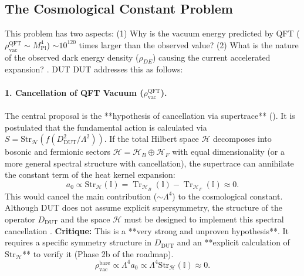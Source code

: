 \documentclass[11pt, a4paper]{article}
\theoremstyle{remark}
\newcommand{\Str}{\mathrm{Str}}
\DeclareMathOperator{\Tr}{Tr}
\newcommand{\Mpl}{M_{\mathrm{Pl}}}
\begin{document}
\subsection{The Cosmological Constant Problem }
\label{sec:problema_cc_final_revised}
This problem has two aspects: (1) Why is the vacuum energy predicted by QFT (\( \rho_{\text{vac}}^{\text{QFT}} \sim \Mpl^4 \)) \( \sim 10^{120} \) times larger than the observed value? (2) What is the nature of the observed dark energy density (\( \rho_{DE} \)) causing the current accelerated expansion? \citep{Weinberg1989CosmoConst}.
DUT DUT addresses this as follows:

\paragraph{1. Cancellation of QFT Vacuum (\( \rho_{\text{vac}}^{\text{QFT}} \)).}
The central proposal is the **hypothesis of cancellation via supertrace** (). It is postulated that the fundamental action is calculated via \( S = \Str_{\mathcal{H}}(f(D_{\text{DUT}}^2/\Lambda^2)) \). If the total Hilbert space \( \mathcal{H} \) decomposes into bosonic and fermionic sectors \( \mathcal{H} = \mathcal{H}_B \oplus \mathcal{H}_F \) with equal dimensionality (or a more general spectral structure with cancellation), the supertrace can annihilate the constant term of the heat kernel expansion:
\[
a_0 \propto \Str_{\mathcal{H}}(\mathbb{I}) = \Tr_{\mathcal{H}_B}(\mathbb{I}) - \Tr_{\mathcal{H}_F}(\mathbb{I}) \approx 0.
\]
This would cancel the main contribution (\(\sim \Lambda^4\)) to the cosmological constant. Although DUT does not assume explicit supersymmetry, the structure of the operator \( D_{\text{DUT}} \) and the space \( \mathcal{H} \) must be designed to implement this spectral cancellation \citep{ChamseddineConnes1997}.
\textbf{Critique:} This is a **very strong and unproven hypothesis**. It requires a specific symmetry structure in \( D_{\text{DUT}} \) and an **explicit calculation of \( \Str_{\mathcal{H}} \)** to verify it (Phase 2b of the roadmap).
\begin{equation} \label{eq:cancelacion_vacio_str_final_redux}
 \rho_{\text{vac}}^{\text{bare}} \propto \Lambda^4 a_0 \propto \Lambda^4 \Str_{\mathcal{H}}(\mathbb{I}) \approx 0.
\end{equation}
\end{document}
